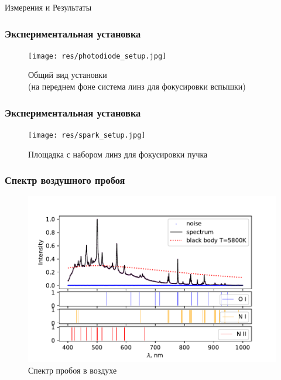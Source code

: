 \documentclass{beamer}
\begin{document}
	\begin{frame}[plain,c]
		
		\begin{center}
			\huge {} Измерения и Результаты
		\end{center}
		
	\end{frame}
	
	
	\begin{frame}
		\frametitle{Экспериментальная установка}
		\begin{figure}
			\centering
			\texttt{[image: res/photodiode\_setup.jpg]}
			\caption*{Общий вид установки\\ \footnotesize (на переднем фоне система линз для фокусировки вспышки) }
		\end{figure}
	\end{frame}
	
	\begin{frame}
		\frametitle{Экспериментальная установка}
		\begin{figure}
			\centering
			\texttt{[image: res/spark\_setup.jpg]}
			\caption*{Площадка с набором линз для фокусировки пучка}
		\end{figure}
		
	\end{frame}
	
	\begin{frame}
		\frametitle{Спектр воздушного пробоя}
		\begin{figure}
			\centering
			\includegraphics[width=\linewidth]{gen/air_lines.pdf}
			\caption*{Спектр пробоя в воздухе}
		\end{figure}
	\end{frame}
	
\end{document}
